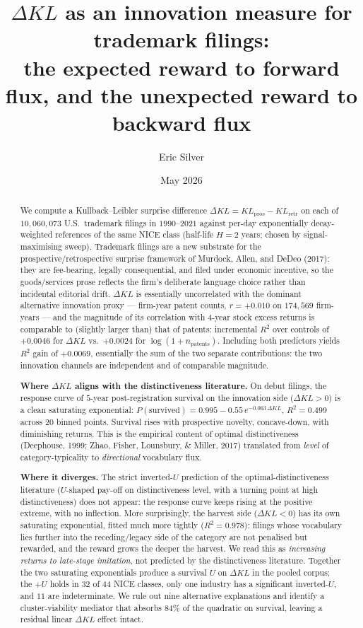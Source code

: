 \documentclass[11pt]{article}
\title{$\Delta KL$ as an innovation measure for trademark filings:\\
the expected reward to forward flux, and the unexpected reward to
backward flux}
\author{Eric Silver}
\affil{}
\date{May 2026}
\begin{document}
\maketitle

\begin{abstract}
We compute a Kullback--Leibler surprise difference $\Delta KL =
KL_{\text{pros}} - KL_{\text{retr}}$ on each of $10{,}060{,}073$
U.S.\ trademark filings in $1990$--$2021$ against per-day
exponentially decay-weighted references of the same NICE class
(half-life $H = 2$ years; chosen by signal-maximising sweep).
Trademark filings are a new substrate for the
prospective/retrospective surprise framework of Murdock, Allen, and
DeDeo (2017): they are fee-bearing, legally consequential, and
filed under economic incentive, so the goods/services prose
reflects the firm's deliberate language choice rather than
incidental editorial drift. $\Delta KL$ is essentially uncorrelated
with the dominant alternative innovation proxy --- firm-year patent
counts, $r = +0.010$ on $174{,}569$ firm-years --- and the magnitude
of its correlation with $4$-year stock excess returns is comparable
to (slightly larger than) that of patents: incremental $R^2$ over
controls of $+0.0046$ for $\Delta KL$ vs.\ $+0.0024$ for $\log(1 +
n_\text{patents})$. Including both predictors yields $R^2$ gain of
$+0.0069$, essentially the sum of the two separate contributions:
the two innovation channels are independent and of comparable
magnitude.

\textbf{Where $\Delta KL$ aligns with the distinctiveness literature.}
On debut filings, the response curve of $5$-year post-registration
survival on the innovation side ($\Delta KL > 0$) is a clean
saturating exponential: $P(\text{survived}) = 0.995 - 0.55\,
e^{-0.063\,\Delta KL}$, $R^2 = 0.499$ across $20$ binned points.
Survival rises with prospective novelty, concave-down, with
diminishing returns. This is the empirical content of optimal
distinctiveness (Deephouse, 1999; Zhao, Fisher, Lounsbury, \&
Miller, 2017) translated from \emph{level} of category-typicality
to \emph{directional} vocabulary flux.

\textbf{Where it diverges.} The strict inverted-$U$ prediction of
the optimal-distinctiveness literature ($U$-shaped pay-off on
distinctiveness level, with a turning point at high distinctiveness)
does not appear: the response curve keeps rising at the positive
extreme, with no inflection. More surprisingly, the harvest side
($\Delta KL < 0$) has its own saturating exponential, fitted much
more tightly ($R^2 = 0.978$): filings whose vocabulary lies further
into the receding/legacy side of the category are not penalised but
rewarded, and the reward grows the deeper the harvest. We read this
as \emph{increasing returns to late-stage imitation}, not predicted
by the distinctiveness literature. Together the two saturating
exponentials produce a survival $U$ on $\Delta KL$ in the pooled
corpus; the $+U$ holds in $32$ of $44$ NICE classes, only one
industry has a significant inverted-$U$, and $11$ are indeterminate.
We rule out nine alternative explanations and identify a
cluster-viability mediator that absorbs $84\%$ of the quadratic on
survival, leaving a residual linear $\Delta KL$ effect intact.


\end{abstract}
\end{document}
